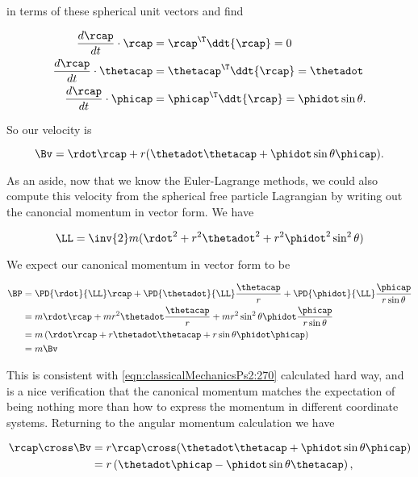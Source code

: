 in terms of these spherical unit vectors and find

\begin{align}\label{eqn:classicalMechanicsPs2:250}
\frac{d\rcap}{dt} \cdot \rcap &= \rcap^\T \ddt{\rcap} = 0  \\
\frac{d\rcap}{dt} \cdot \thetacap &= \thetacap^\T \ddt{\rcap} = \thetadot \\
\frac{d\rcap}{dt} \cdot \phicap &= \phicap^\T \ddt{\rcap} = \phidot \sin\theta.
\end{align}

So our velocity is

\begin{equation}\label{eqn:classicalMechanicsPs2:270}
\Bv = \rdot \rcap + r (\thetadot \thetacap + \phidot \sin\theta \phicap).
\end{equation}

As an aside, now that we know the Euler-Lagrange methods, we could also compute this velocity from the spherical free particle Lagrangian by writing out the canoncial momentum in vector form.  We have

\begin{equation}\label{eqn:classicalMechanicsPs2:290}
\LL = \inv{2} m ( \rdot^2 + r^2 \thetadot^2 + r^2 \phidot^2 \sin^2 \theta)
\end{equation}

We expect our canonical momentum in vector form to be

\begin{align*}
\BP &=
\PD{\rdot}{\LL} \rcap
+\PD{\thetadot}{\LL} \frac{\thetacap}{r}
+\PD{\phidot}{\LL} \frac{\phicap}{r \sin\theta} \\
&=
m \rdot \rcap 
+ m r^2 \thetadot \frac{\thetacap}{r}
+ m r^2 \sin^2\theta \phidot \frac{\phicap}{r \sin\theta} \\
&=
m
\left( 
\rdot \rcap + r \thetadot \thetacap + r \sin\theta \phidot \phicap
\right) \\
&= m \Bv
\end{align*}

This is consistent with \ref{eqn:classicalMechanicsPs2:270} calculated hard way, and is a nice verification that the canonical momentum matches the expectation of being nothing more than how to express the momentum in different coordinate systems.  Returning to the angular momentum calculation we have

\begin{align*}
\rcap \cross \Bv
&=
r \rcap \cross (\thetadot \thetacap + \phidot \sin\theta \phicap) \\
&=
r \left( \thetadot \phicap - \phidot \sin\theta \thetacap \right) ,
\end{align*}

